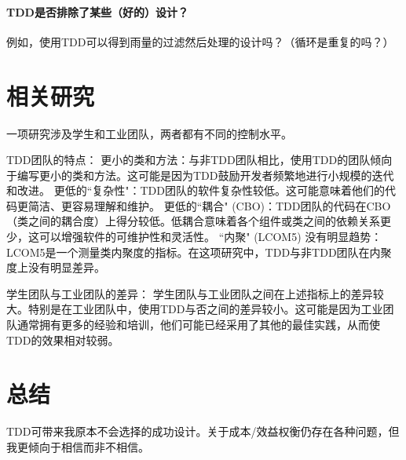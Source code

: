 \paragraph{TDD是否排除了某些（好的）设计？}
例如，使用TDD可以得到雨量的过滤然后处理的设计吗？（循环是重复的吗？）

\section{相关研究}

一项研究涉及学生和工业团队，两者都有不同的控制水平。

TDD团队的特点：
更小的类和方法：与非TDD团队相比，使用TDD的团队倾向于编写更小的类和方法。这可能是因为TDD鼓励开发者频繁地进行小规模的迭代和改进。
更低的``复杂性"：TDD团队的软件复杂性较低。这可能意味着他们的代码更简洁、更容易理解和维护。
更低的``耦合" (CBO)：TDD团队的代码在CBO（类之间的耦合度）上得分较低。低耦合意味着各个组件或类之间的依赖关系更少，这可以增强软件的可维护性和灵活性。
``内聚" (LCOM5) 没有明显趋势：LCOM5是一个测量类内聚度的指标。在这项研究中，TDD与非TDD团队在内聚度上没有明显差异。

学生团队与工业团队的差异：
学生团队与工业团队之间在上述指标上的差异较大。特别是在工业团队中，使用TDD与否之间的差异较小。这可能是因为工业团队通常拥有更多的经验和培训，他们可能已经采用了其他的最佳实践，从而使TDD的效果相对较弱。

\section{总结}
TDD可带来我原本不会选择的成功设计。关于成本/效益权衡仍存在各种问题，但我更倾向于相信而非不相信。



































